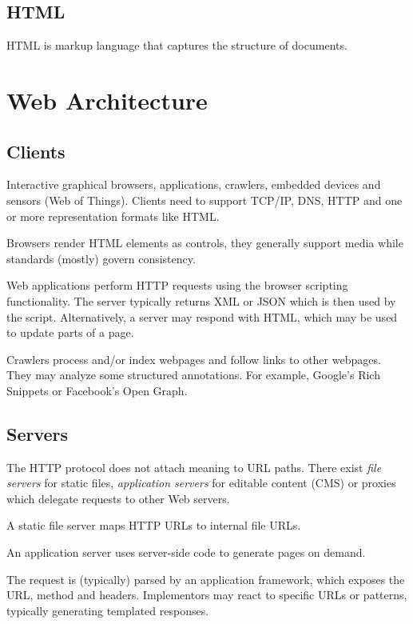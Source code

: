 \documentclass{report}
\begin{document}
\subsection{HTML}

HTML is markup language that captures the structure of documents.

\section{Web Architecture}

\subsection{Clients}

Interactive graphical browsers, applications, crawlers,
embedded devices and sensors (Web of Things).
Clients need to support TCP/IP, DNS, HTTP
and one or more representation formats like HTML.

Browsers render HTML elements as controls,
they generally support media
while standards (mostly) govern consistency.

Web applications perform HTTP requests
using the browser scripting functionality.
The server typically returns XML or JSON
which is then used by the script.
Alternatively, a server may respond with HTML,
which may be used to update parts of a page.

Crawlers process and/or index webpages
and follow links to other webpages.
They may analyze some structured annotations.
For example, Google's Rich Snippets
or Facebook's Open Graph.

\subsection{Servers}

The HTTP protocol does not attach meaning to URL paths.
There exist \emph{file servers} for static files,
\emph{application servers} for editable content (CMS)
or proxies which delegate requests to other Web servers.

A static file server maps HTTP URLs to internal file URLs.

An application server uses server-side code
to generate pages on demand.

The request is (typically) parsed by an application framework,
which exposes the URL, method and headers.
Implementors may react to specific URLs or patterns,
typically generating templated responses.
\end{document}
